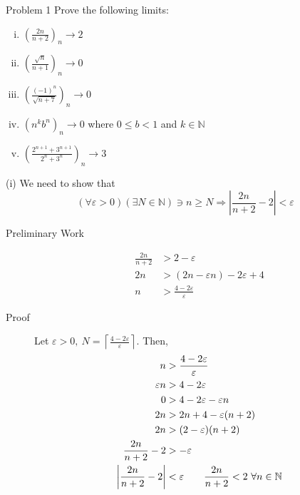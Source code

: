 \documentclass[10pt]{extarticle}
\title{}
\author{Avinash Iyer}
\date{}
\newcommand{\N}{\mathbb{N}}
\begin{document}
  \begin{problem}{Problem 1}
    Prove the following limits:
    \begin{enumerate}[(i)]
      \item $\displaystyle \left(\frac{2n}{n+2}\right)_n \rightarrow 2$
      \item $\displaystyle \left(\frac{\sqrt{n}}{n+1}\right)_n \rightarrow 0$
      \item $\displaystyle \left(\frac{(-1)^n}{\sqrt{n+7}}\right)_n \rightarrow 0$
      \item $\displaystyle \left(n^kb^n\right)_n \rightarrow 0$ where $0\leq b < 1$ and $k\in\N$
      \item $\displaystyle \left(\frac{2^{n+1}+3^{n+1}}{2^n + 3^n}\right)_n \rightarrow 3$
    \end{enumerate}
    \tcblower
    \begin{problem}{(i)}
     We need to show that
      \[(\forall \varepsilon > 0)(\exists N\in\N) \ni n \geq N \Rightarrow \left|\frac{2n}{n+2} - 2\right| < \varepsilon\]
      \begin{description}
        \item[Preliminary Work] 
          \begin{align*}
            \frac{2n}{n+2} &> 2-\varepsilon\\
            2n &> (2n - \varepsilon n) - 2\varepsilon + 4\\
            n &> \frac{4-2\varepsilon}{\varepsilon}
          \end{align*}
        \item[Proof] Let $\varepsilon > 0,~\displaystyle N = \left\lceil\frac{4-2\varepsilon}{\varepsilon}\right\rceil$. Then,
          \begin{align*}
            n &> \frac{4-2\varepsilon}{\varepsilon}\\
            \varepsilon n &> 4-2\varepsilon\\
            0 &> 4-2\varepsilon-\varepsilon n\\
            2n &> 2n + 4 - \varepsilon (n+2)\\
            2n &> (2-\varepsilon)(n+2)\\
            \frac{2n}{n+2} - 2 &> -\varepsilon\\
            \left|\frac{2n}{n+2}-2\right| &< \varepsilon \tag*{$\displaystyle \frac{2n}{n+2}< 2~\forall n\in\N$} 
          \end{align*}
      \end{description}
    \end{problem}

\end{problem}
\end{document}
